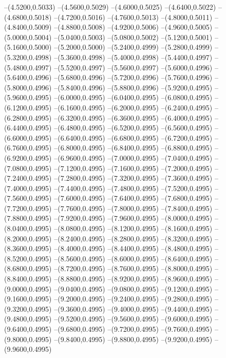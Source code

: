 {	--(4.5200,0.5033)
	--(4.5600,0.5029)
	--(4.6000,0.5025)
	--(4.6400,0.5022)
	--(4.6800,0.5018)
	--(4.7200,0.5016)
	--(4.7600,0.5013)
	--(4.8000,0.5011)
	--(4.8400,0.5009)
	--(4.8800,0.5008)
	--(4.9200,0.5006)
	--(4.9600,0.5005)
	--(5.0000,0.5004)
	--(5.0400,0.5003)
	--(5.0800,0.5002)
	--(5.1200,0.5001)
	--(5.1600,0.5000)
	--(5.2000,0.5000)
	--(5.2400,0.4999)
	--(5.2800,0.4999)
	--(5.3200,0.4998)
	--(5.3600,0.4998)
	--(5.4000,0.4998)
	--(5.4400,0.4997)
	--(5.4800,0.4997)
	--(5.5200,0.4997)
	--(5.5600,0.4997)
	--(5.6000,0.4996)
	--(5.6400,0.4996)
	--(5.6800,0.4996)
	--(5.7200,0.4996)
	--(5.7600,0.4996)
	--(5.8000,0.4996)
	--(5.8400,0.4996)
	--(5.8800,0.4996)
	--(5.9200,0.4995)
	--(5.9600,0.4995)
	--(6.0000,0.4995)
	--(6.0400,0.4995)
	--(6.0800,0.4995)
	--(6.1200,0.4995)
	--(6.1600,0.4995)
	--(6.2000,0.4995)
	--(6.2400,0.4995)
	--(6.2800,0.4995)
	--(6.3200,0.4995)
	--(6.3600,0.4995)
	--(6.4000,0.4995)
	--(6.4400,0.4995)
	--(6.4800,0.4995)
	--(6.5200,0.4995)
	--(6.5600,0.4995)
	--(6.6000,0.4995)
	--(6.6400,0.4995)
	--(6.6800,0.4995)
	--(6.7200,0.4995)
	--(6.7600,0.4995)
	--(6.8000,0.4995)
	--(6.8400,0.4995)
	--(6.8800,0.4995)
	--(6.9200,0.4995)
	--(6.9600,0.4995)
	--(7.0000,0.4995)
	--(7.0400,0.4995)
	--(7.0800,0.4995)
	--(7.1200,0.4995)
	--(7.1600,0.4995)
	--(7.2000,0.4995)
	--(7.2400,0.4995)
	--(7.2800,0.4995)
	--(7.3200,0.4995)
	--(7.3600,0.4995)
	--(7.4000,0.4995)
	--(7.4400,0.4995)
	--(7.4800,0.4995)
	--(7.5200,0.4995)
	--(7.5600,0.4995)
	--(7.6000,0.4995)
	--(7.6400,0.4995)
	--(7.6800,0.4995)
	--(7.7200,0.4995)
	--(7.7600,0.4995)
	--(7.8000,0.4995)
	--(7.8400,0.4995)
	--(7.8800,0.4995)
	--(7.9200,0.4995)
	--(7.9600,0.4995)
	--(8.0000,0.4995)
	--(8.0400,0.4995)
	--(8.0800,0.4995)
	--(8.1200,0.4995)
	--(8.1600,0.4995)
	--(8.2000,0.4995)
	--(8.2400,0.4995)
	--(8.2800,0.4995)
	--(8.3200,0.4995)
	--(8.3600,0.4995)
	--(8.4000,0.4995)
	--(8.4400,0.4995)
	--(8.4800,0.4995)
	--(8.5200,0.4995)
	--(8.5600,0.4995)
	--(8.6000,0.4995)
	--(8.6400,0.4995)
	--(8.6800,0.4995)
	--(8.7200,0.4995)
	--(8.7600,0.4995)
	--(8.8000,0.4995)
	--(8.8400,0.4995)
	--(8.8800,0.4995)
	--(8.9200,0.4995)
	--(8.9600,0.4995)
	--(9.0000,0.4995)
	--(9.0400,0.4995)
	--(9.0800,0.4995)
	--(9.1200,0.4995)
	--(9.1600,0.4995)
	--(9.2000,0.4995)
	--(9.2400,0.4995)
	--(9.2800,0.4995)
	--(9.3200,0.4995)
	--(9.3600,0.4995)
	--(9.4000,0.4995)
	--(9.4400,0.4995)
	--(9.4800,0.4995)
	--(9.5200,0.4995)
	--(9.5600,0.4995)
	--(9.6000,0.4995)
	--(9.6400,0.4995)
	--(9.6800,0.4995)
	--(9.7200,0.4995)
	--(9.7600,0.4995)
	--(9.8000,0.4995)
	--(9.8400,0.4995)
	--(9.8800,0.4995)
	--(9.9200,0.4995)
	--(9.9600,0.4995)
}
